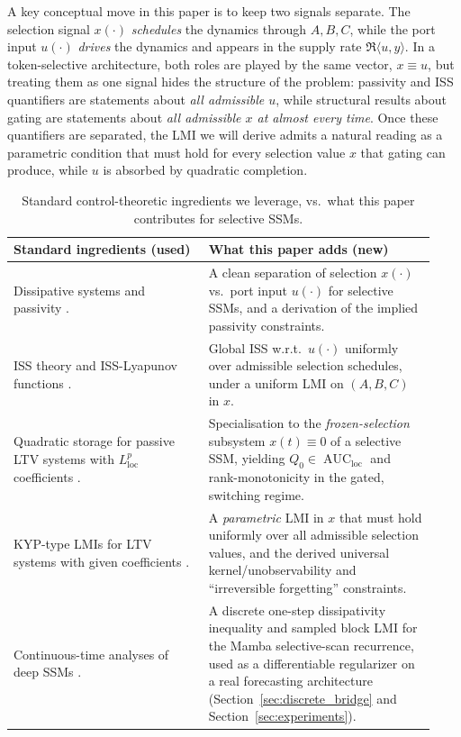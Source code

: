 \documentclass[10pt]{article} %
\newcommand{\loc}{\mathrm{loc}}                         %
\DeclareMathOperator{\AUC}{AUC}                         %
\theoremstyle{definition}
\begin{document}
A key conceptual move in this paper is to keep two signals separate. The selection signal $x(\cdot)$ \emph{schedules} the dynamics through $A,B,C$, while the port input $u(\cdot)$ \emph{drives} the dynamics and appears in the supply rate $\Re\langle u, y\rangle$. In a token-selective architecture, both roles are played by the same vector, $x\equiv u$, but treating them as one signal hides the structure of the problem: passivity and ISS quantifiers are statements about \emph{all admissible $u$}, while structural results about gating are statements about \emph{all admissible $x$ at almost every time}. Once these quantifiers are separated, the LMI we will derive admits a natural reading as a parametric condition that must hold for every selection value $x$ that gating can produce, while $u$ is absorbed by quadratic completion.

\begin{table}[h]
\centering
\small
\begin{tabular}{p{0.43\linewidth} p{0.50\linewidth}}
\toprule
\textbf{Standard ingredients (used)} & \textbf{What this paper adds (new)}\\
\midrule
Dissipative systems and passivity \citep{Willems1972DissipativeDS, van2000l2}.
& A clean separation of selection $x(\cdot)$ vs.\ port input $u(\cdot)$ for selective SSMs, and a derivation of the implied passivity constraints.\\
\midrule
ISS theory and ISS-Lyapunov functions \citep{Sontag1989SmoothSF, Jiang1999InputtostateSF}.
& Global ISS w.r.t.\ $u(\cdot)$ uniformly over admissible selection schedules, under a uniform LMI on $(A,B,C)$ in $x$.\\
\midrule
Quadratic storage for passive LTV systems with $L^p_{\loc}$ coefficients \citep{MorandinHinsen2024}.
& Specialisation to the \emph{frozen-selection} subsystem $x(t)\equiv 0$ of a selective SSM, yielding $Q_0\in\AUC_{\loc}$ and rank-monotonicity in the gated, switching regime.\\
\midrule
KYP-type LMIs for LTV systems with given coefficients \citep{kalman1963lyapunov, anderson2013network}.
& A \emph{parametric} LMI in $x$ that must hold uniformly over all admissible selection values, and the derived universal kernel/unobservability and ``irreversible forgetting'' constraints.\\
\midrule
Continuous-time analyses of deep SSMs \citep{halloran2024mamba, gu2022efficiently}.
& A discrete one-step dissipativity inequality and sampled block LMI for the Mamba selective-scan recurrence, used as a differentiable regularizer on a real forecasting architecture (Section~\ref{sec:discrete_bridge} and Section~\ref{sec:experiments}).\\
\bottomrule
\end{tabular}
\caption{Standard control-theoretic ingredients we leverage, vs.\ what this paper contributes for selective SSMs.}
\label{tab:standard_vs_new}
\end{table}
\end{document}
